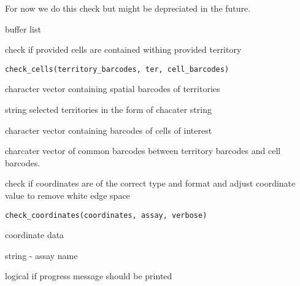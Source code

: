 \documentclass[a4paper]{book}
\begin{document}
%
\begin{Details}
For now we do this check but might be depreciated in the future.
\end{Details}
%
\begin{Value}
buffer list
\end{Value}
%
\begin{Description}
check if provided cells are contained withing provided territory
\end{Description}
%
\begin{Usage}
\begin{verbatim}
check_cells(territory_barcodes, ter, cell_barcodes)
\end{verbatim}
\end{Usage}
%
\begin{Arguments}
\begin{ldescription}
\item[\code{territory\_barcodes}] character vector containing spatial barcodes
of territories

\item[\code{ter}] string selected territories in the form of chacater string

\item[\code{cell\_barcodes}] character vector containing barcodes of cells
of interest
\end{ldescription}
\end{Arguments}
%
\begin{Value}
charcater vector of common barcodes between territory 
barcodes and cell barcodes.
\end{Value}
%
\begin{Description}
check if coordinates are of the correct type and format and
adjust coordinate value to remove white edge space
\end{Description}
%
\begin{Usage}
\begin{verbatim}
check_coordinates(coordinates, assay, verbose)
\end{verbatim}
\end{Usage}
%
\begin{Arguments}
\begin{ldescription}
\item[\code{coordinates}] coordinate data

\item[\code{assay}] string - assay name

\item[\code{verbose}] logical if progress message should be printed
\end{ldescription}
\end{Arguments}
\end{document}
